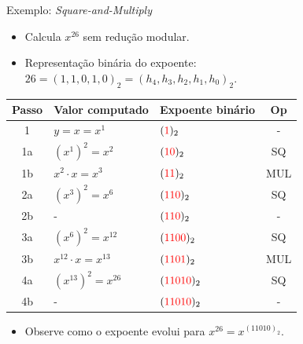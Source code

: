 \documentclass{beamer}
\begin{document}
\begin{frame}{Exemplo: \textit{Square-and-Multiply}}
    \begin{itemize}
        \item Calcula $x^{26}$ sem redução modular.
        \item Representação binária do expoente: $26 = (1,1,0,1,0)_2 = (h_4, h_3, h_2, h_1, h_0)_2$.
    \end{itemize}
    \begin{center}
        
        \vspace{0.5em}
        \begingroup %
        \footnotesize %
        \setlength{\tabcolsep}{4pt} %
        \begin{tabular}{cllc} %
            \toprule
            Passo & Valor computado         & Expoente binário             & Op  \\ %
            \midrule
            1   & $y = x = x^1$           & $(\textcolor{red}{1})_2$      & -   \\ %
            \addlinespace %
            1a  & $(x^1)^2 = x^2$         & $(\textcolor{red}{10})_2$     & SQ  \\
            1b  & $x^2 \cdot x = x^3$     & $(\textcolor{red}{11})_2$     & MUL \\
            \addlinespace
            2a  & $(x^3)^2 = x^6$         & $(\textcolor{red}{110})_2$    & SQ  \\
            2b  & -                       & $(\textcolor{red}{110})_2$    & -   \\
            \addlinespace
            3a  & $(x^6)^2 = x^{12}$      & $(\textcolor{red}{1100})_2$   & SQ  \\
            3b  & $x^{12} \cdot x = x^{13}$ & $(\textcolor{red}{1101})_2$   & MUL \\
            \addlinespace
            4a  & $(x^{13})^2 = x^{26}$   & $(\textcolor{red}{11010})_2$ & SQ  \\
            4b  & -                       & $(\textcolor{red}{11010})_2$ & -   \\
            \bottomrule
        \end{tabular}
        \endgroup
        \vspace{-0.5em}
    \end{center}

    \begin{itemize}
        \item Observe como o expoente evolui para $x^{26} = x^{(11010)_2}$.
    \end{itemize}
\end{frame}
\end{document}
